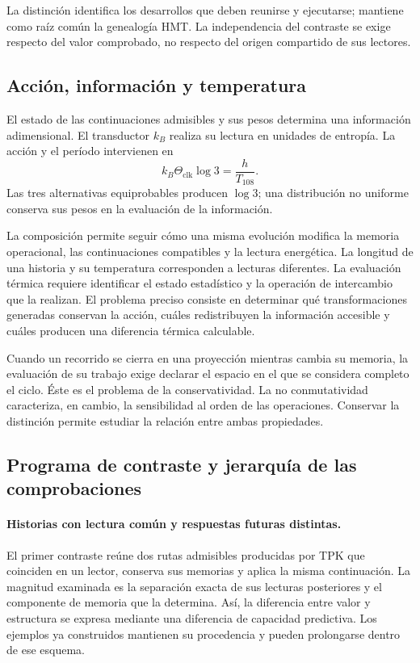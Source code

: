 La distinción identifica los desarrollos que deben reunirse y
ejecutarse; mantiene como raíz común la genealogía HMT. La independencia
del contraste se exige respecto del valor comprobado, no respecto
del origen compartido de sus lectores.

\subsection{Acción, información y temperatura}
\label{md:lectin:termica}

El estado de las continuaciones admisibles y sus pesos determina una
información adimensional. El transductor $k_B$ realiza su lectura en
unidades de entropía. La acción y el período intervienen en
\begin{equation}
 k_B\Theta_{\mathrm{clk}}\log3=\frac{h}{T_{108}}.
 \label{md:lectin:accion-informacion}
\end{equation}
Las tres alternativas equiprobables producen $\log3$; una distribución
no uniforme conserva sus pesos en la evaluación de la información.

La composición permite seguir cómo una misma evolución modifica la
memoria operacional, las continuaciones compatibles y la lectura
energética. La longitud de una historia y su temperatura corresponden
a lecturas diferentes. La evaluación térmica requiere identificar el
estado estadístico y la operación de intercambio que la realizan.
El problema preciso consiste en determinar qué transformaciones
generadas conservan la acción, cuáles redistribuyen la información
accesible y cuáles producen una diferencia térmica calculable.

Cuando un recorrido se cierra en una proyección mientras cambia su
memoria, la evaluación de su trabajo exige declarar el espacio en el
que se considera completo el ciclo. Éste es el problema de la
conservatividad. La no conmutatividad caracteriza, en cambio, la
sensibilidad al orden de las operaciones. Conservar la distinción
permite estudiar la relación entre ambas propiedades.

\subsection{Programa de contraste y jerarquía de las comprobaciones}
\label{md:lectin:contrastes}

\paragraph{Historias con lectura común y respuestas futuras distintas.}
El primer contraste reúne dos rutas admisibles producidas por TPK
que coinciden en un lector, conserva sus memorias y aplica la misma
continuación. La magnitud examinada es la separación exacta de sus
lecturas posteriores y el componente de memoria que la determina.
Así, la diferencia entre valor y estructura se expresa mediante una
diferencia de capacidad predictiva. Los ejemplos ya construidos
mantienen su procedencia y pueden prolongarse dentro de ese esquema.

